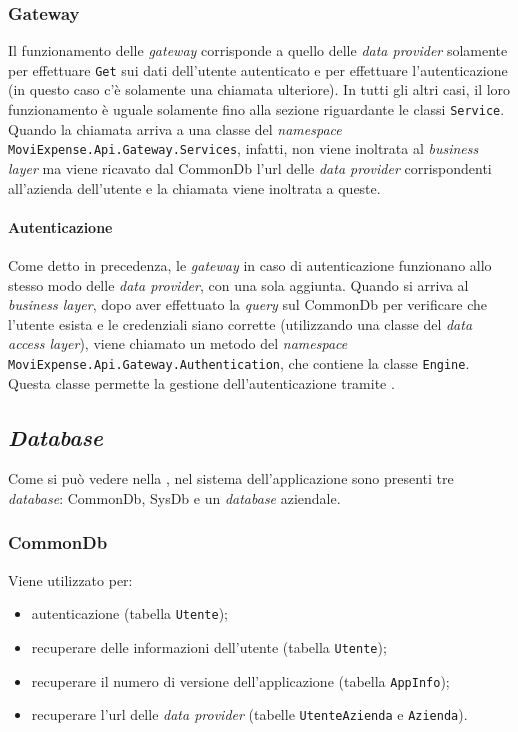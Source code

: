 \subsubsection{Gateway}

Il funzionamento delle  \textit{gateway} corrisponde a quello delle \textit{data provider} solamente per effettuare \texttt{Get} sui dati dell'utente autenticato e per effettuare l'autenticazione (in questo caso c'è solamente una chiamata ulteriore). In tutti gli altri casi, il loro funzionamento è uguale solamente fino alla sezione riguardante le classi \texttt{Service}. Quando la chiamata arriva a una classe del \textit{namespace} \texttt{MoviExpense.Api.Gateway.Services}, infatti, non viene inoltrata al \textit{business layer} ma viene ricavato dal CommonDb l'url delle  \textit{data provider} corrispondenti all'azienda dell'utente e la chiamata viene inoltrata a queste.

\paragraph{Autenticazione} Come detto in precedenza, le  \textit{gateway} in caso di autenticazione funzionano allo stesso modo delle \textit{data provider}, con una sola aggiunta. Quando si arriva al \textit{business layer}, dopo aver effettuato la \textit{query} sul CommonDb per verificare che l'utente esista e le credenziali siano corrette (utilizzando una classe del \textit{data access layer}), viene chiamato un metodo del \textit{namespace} \texttt{MoviExpense.Api.Gateway.Authentication}, che contiene la classe \texttt{Engine}. Questa classe permette la gestione dell'autenticazione tramite .


\subsection{\textit{Database}}

Come si può vedere nella , nel sistema dell'applicazione sono presenti tre \textit{database}: CommonDb, SysDb e un \textit{database} aziendale.

\subsubsection{CommonDb}

Viene utilizzato per:
\begin{itemize}
    \item autenticazione (tabella \texttt{Utente});
    \item recuperare delle informazioni dell'utente (tabella \texttt{Utente});
    \item recuperare il numero di versione dell'applicazione (tabella \texttt{AppInfo});
    \item recuperare l'url delle  \textit{data provider} (tabelle \texttt{UtenteAzienda} e \texttt{Azienda}).
\end{itemize}

